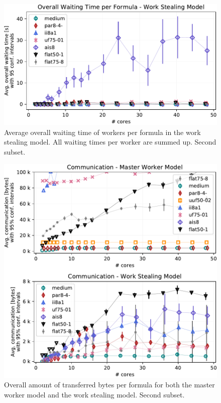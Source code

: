 \documentclass[letterpaper]{article}
\begin{document}
\begin{figure}[p]
    \centering
    \includegraphics[width=\columnwidth]{figures/waiting_stealing_non_subset_dpll_scaling_tar.pdf}
    \caption{Average overall waiting time of workers per formula in the work stealing model.
    All waiting times per worker are summed up.
    Second subset.}
    \label{fig:dpll_stealing_waiting_non}
\end{figure}

\begin{figure}[p]
    \centering
    \includegraphics[width=\columnwidth]{figures/comm_non_subset_dpll_scaling_tar.pdf}
    \caption{Overall amount of transferred bytes per formula for both the master worker model and the work stealing model.
    Second subset.}
    \label{fig:comm_reduce_non}
\end{figure}
\end{document}
